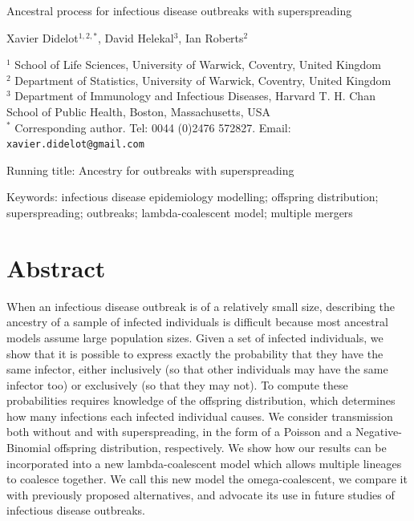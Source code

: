 \documentclass{article}
\begin{document}
{\Large Ancestral process for infectious disease outbreaks with superspreading}


\vspace*{2cm}
Xavier Didelot$^{1,2,*}$, David Helekal$^{3}$, Ian Roberts$^{2}$

\vspace*{2cm}
$^1$ School of Life Sciences, University of Warwick, Coventry, United Kingdom\\
$^2$ Department of Statistics, University of Warwick, Coventry, United Kingdom\\
$^3$ Department of Immunology and Infectious Diseases, Harvard T. H. Chan School of Public Health, Boston, Massachusetts, USA\\
$^*$ Corresponding author. Tel: 0044 (0)2476 572827. Email: \verb+xavier.didelot@gmail.com+

\vspace*{2cm}
Running title: Ancestry for outbreaks with superspreading

\vspace*{2cm}
Keywords: infectious disease epidemiology modelling; offspring distribution; superspreading; outbreaks; lambda-coalescent model; multiple mergers

\newpage
\section*{Abstract}

When an infectious disease outbreak is of a relatively small size, describing the ancestry
of a sample of infected individuals is difficult because most ancestral models assume
large population sizes. Given a set of infected individuals, 
we show that it is possible to express exactly
the probability that they have the same infector, either inclusively
(so that other individuals may have the same infector too) or exclusively 
(so that they may not).
To compute these probabilities requires knowledge of the offspring distribution, 
which determines how many infections each infected individual causes. 
We consider transmission both without and with superspreading, in the form of a 
Poisson and a Negative-Binomial offspring distribution, respectively. 
We show how our results can be incorporated into a new lambda-coalescent model
which allows multiple lineages to coalesce together. 
We call this new model the omega-coalescent, we compare it
with previously proposed alternatives, and advocate its use
in future studies of infectious disease outbreaks.
\end{document}
